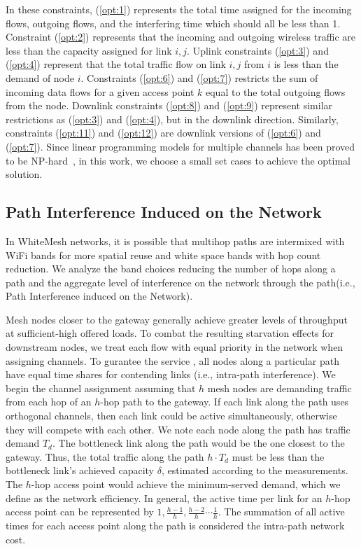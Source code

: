 In these constraints, (\ref{opt:1}) represents the total time assigned for the incoming flows, outgoing flows, 
and the interfering time which should all be less than 1. Constraint (\ref{opt:2}) represents that the incoming and 
outgoing wireless traffic are less than the capacity assigned for link $i,j$. Uplink constraints 
(\ref{opt:3}) and (\ref{opt:4}) represent that the total traffic flow on link $i,j$ from $i$ is less than 
the demand of node $i$. Constraints (\ref{opt:6}) and (\ref{opt:7}) restricts the sum of incoming data 
flows for a given access point $k$ equal to the total outgoing flows from the node. Downlink constraints 
(\ref{opt:8}) and (\ref{opt:9}) represent similar restrictions as (\ref{opt:3}) and (\ref{opt:4}), but 
in the downlink direction. Similarly, constraints (\ref{opt:11}) and (\ref{opt:12}) are downlink versions of 
(\ref{opt:6}) and (\ref{opt:7}).
Since linear programming models for multiple channels has been proved to be NP-hard~\cite{yuan2006cross},
in this work, we choose a small set cases to achieve the optimal solution.



%
\subsection{Path Interference Induced on the Network}
\label{subsec:PEN}

In WhiteMesh networks, it is possible that multihop paths are intermixed with WiFi bands for more spatial reuse 
and white space bands with hop count reduction. We analyze the band choices reducing the number of hops along 
a path and the aggregate level of interference on the network through the path(i.e., Path 
Interference induced on the Network).

Mesh nodes closer to the gateway generally achieve greater levels of throughput at sufficient-high 
offered loads. To combat the resulting starvation effects for downstream nodes, we treat each flow with equal priority in the network 
when assigning channels. To gurantee the service , all nodes along a particular path have equal time shares for 
contending links (i.e., intra-path interference). We begin the channel assignment assuming that $h$ mesh 
nodes are demanding traffic from each hop of an $h$-hop path to the gateway. If each link along the path 
uses orthogonal channels, then each link could be active simultaneously, otherwise they will compete with 
each other. We note each node along the path has traffic demand $T_d$. The bottleneck link 
along the path would be the one closest to the gateway. Thus, the total traffic along the 
path $h \cdot T_d$ must be less than the bottleneck link's achieved capacity $\delta$, estimated according 
to the measurements. The $h$-hop access point would achieve the minimum-served demand, which we define as the 
network efficiency. In general, the active time per link for an $h$-hop access point can be represented by 
$1,\frac{h-1}{h},\frac{h-2}{h}\cdots \frac{1}{h}$. The summation of all active times for each access point 
along the path is considered the intra-path network cost.


